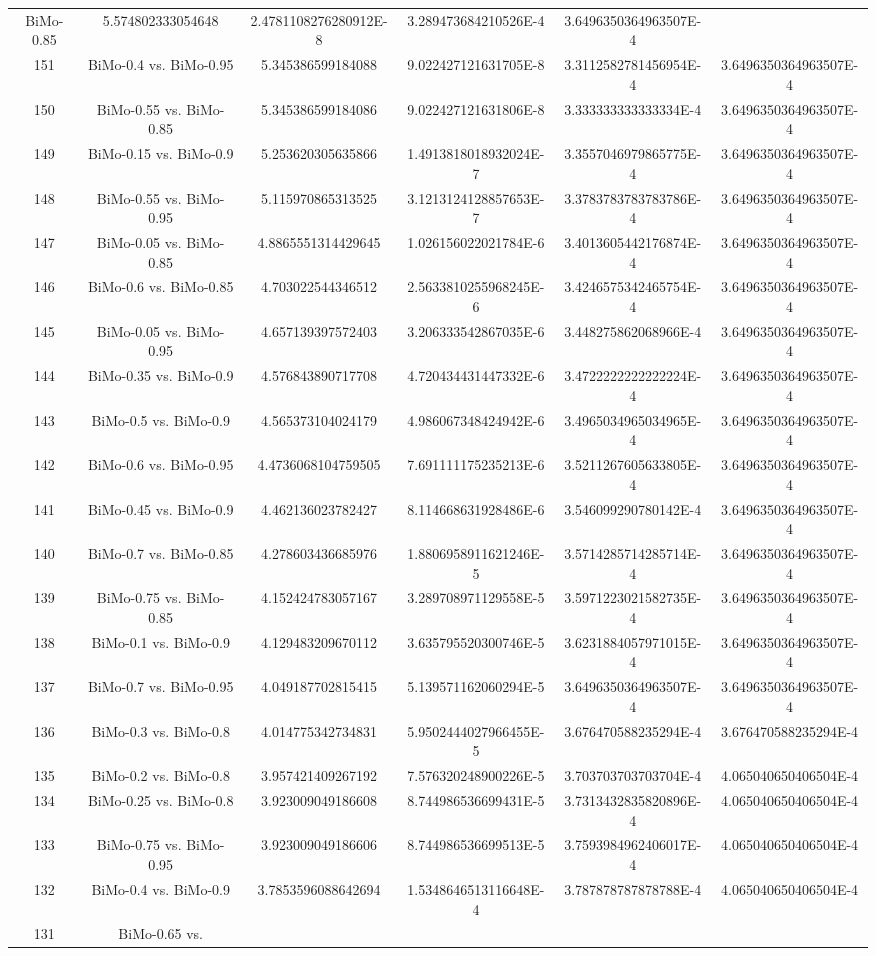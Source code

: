 \documentclass[a4paper,10pt]{article}
\begin{document}
\begin{landscape}
\begin{table}[!htp]
\begin{tabular}{cccccc}
BiMo-0.85&5.574802333054648&2.4781108276280912E-8&3.289473684210526E-4&3.6496350364963507E-4\\151&BiMo-0.4 vs. BiMo-0.95&5.345386599184088&9.022427121631705E-8&3.3112582781456954E-4&3.6496350364963507E-4\\150&BiMo-0.55 vs. BiMo-0.85&5.345386599184086&9.022427121631806E-8&3.333333333333334E-4&3.6496350364963507E-4\\149&BiMo-0.15 vs. BiMo-0.9&5.253620305635866&1.4913818018932024E-7&3.3557046979865775E-4&3.6496350364963507E-4\\148&BiMo-0.55 vs. BiMo-0.95&5.115970865313525&3.1213124128857653E-7&3.3783783783783786E-4&3.6496350364963507E-4\\147&BiMo-0.05 vs. BiMo-0.85&4.8865551314429645&1.026156022021784E-6&3.4013605442176874E-4&3.6496350364963507E-4\\146&BiMo-0.6 vs. BiMo-0.85&4.703022544346512&2.5633810255968245E-6&3.4246575342465754E-4&3.6496350364963507E-4\\145&BiMo-0.05 vs. BiMo-0.95&4.657139397572403&3.206333542867035E-6&3.448275862068966E-4&3.6496350364963507E-4\\144&BiMo-0.35 vs. BiMo-0.9&4.576843890717708&4.720434431447332E-6&3.4722222222222224E-4&3.6496350364963507E-4\\143&BiMo-0.5 vs. BiMo-0.9&4.565373104024179&4.986067348424942E-6&3.4965034965034965E-4&3.6496350364963507E-4\\142&BiMo-0.6 vs. BiMo-0.95&4.4736068104759505&7.691111175235213E-6&3.5211267605633805E-4&3.6496350364963507E-4\\141&BiMo-0.45 vs. BiMo-0.9&4.462136023782427&8.114668631928486E-6&3.546099290780142E-4&3.6496350364963507E-4\\140&BiMo-0.7 vs. BiMo-0.85&4.278603436685976&1.8806958911621246E-5&3.5714285714285714E-4&3.6496350364963507E-4\\139&BiMo-0.75 vs. BiMo-0.85&4.152424783057167&3.289708971129558E-5&3.5971223021582735E-4&3.6496350364963507E-4\\138&BiMo-0.1 vs. BiMo-0.9&4.129483209670112&3.635795520300746E-5&3.6231884057971015E-4&3.6496350364963507E-4\\137&BiMo-0.7 vs. BiMo-0.95&4.049187702815415&5.139571162060294E-5&3.6496350364963507E-4&3.6496350364963507E-4\\136&BiMo-0.3 vs. BiMo-0.8&4.014775342734831&5.9502444027966455E-5&3.676470588235294E-4&3.676470588235294E-4\\135&BiMo-0.2 vs. BiMo-0.8&3.957421409267192&7.576320248900226E-5&3.703703703703704E-4&4.065040650406504E-4\\134&BiMo-0.25 vs. BiMo-0.8&3.923009049186608&8.744986536699431E-5&3.7313432835820896E-4&4.065040650406504E-4\\133&BiMo-0.75 vs. BiMo-0.95&3.923009049186606&8.744986536699513E-5&3.7593984962406017E-4&4.065040650406504E-4\\132&BiMo-0.4 vs. BiMo-0.9&3.7853596088642694&1.5348646513116648E-4&3.787878787878788E-4&4.065040650406504E-4\\131&BiMo-0.65 vs. 
\end{tabular}
\end{table}
\end{landscape}
\end{document}
